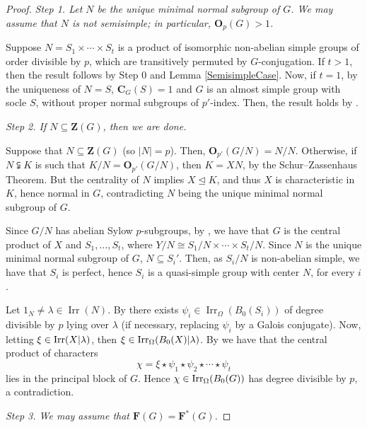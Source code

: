 \documentclass[12pt]{amsart}
\theoremstyle{theorem}
\theoremstyle{definition}
\newcommand{\bC} {\mathbf C}
\newcommand{\bF} {\mathbf F}
\newcommand{\bO}{{\mathbf O}}
\newcommand{\bZ} {\mathbf Z}
\newcommand{\Irr}{{\operatorname{Irr}}}
\begin{document}
\begin{proof}
		\bigskip
		
		\textit{Step 1. Let $N$ be the unique minimal normal subgroup of $G$. We may assume that $N$ is not semisimple; in particular, $\bO_p(G) > 1$.}
		\medskip
		
		Suppose $N = S_1 \times \cdots \times S_t$ is a product of isomorphic non-abelian simple groups of order divisible by $p$, which are transitively permuted by $G$-conjugation. If $t > 1$, then the result follows by Step 0 and Lemma \ref{SemisimpleCase}. Now, if $t = 1$, by the uniqueness of $N = S$, $\bC_G(S) = 1$ and $G$ is an almost simple group with socle $S$, without proper normal subgroups of $p'$-index. Then, the result holds by \cite[Theorem 2.17]{MMRSF}.
		
		\bigskip
		
		\textit{Step 2. If $N\subseteq\bZ(G)$, then we are done.}
		
		\medskip
		
		
		Suppose that $N\subseteq \bZ(G)$ (so $|N|=p$). Then, $\bO_{p'}(G/N) = N/N$. Otherwise, if $N \subsetneqq K$ is such that $K/N = \bO_{p'}(G/N)$, then $K = XN$, by the Schur--Zassenhaus Theorem. But the centrality of $N$ implies $X \unlhd K$, and thus $X$ is characteristic in $K$, hence normal in $G$, contradicting $N$ being the unique minimal normal subgroup of $G$. 
		
		Since $G/N$ has abelian Sylow $p$-subgroups, by \cite[Theorem 4.1]{MinimalHeights}, we have that $G$ is the central product of $X$ and $S_1,\ldots, S_t$, where $Y/N\cong S_1/N\times\cdots\times S_t/N$. Since $N$ is the unique minimal normal subgroup of $G$, $N\subseteq S_i'$. Then, as $S_i/N$ is non-abelian simple, we have that $S_i$ is perfect, hence $S_i$ is a quasi-simple group with center $N$, for every $i$. 
		
		Let $1_N\neq\lambda\in\Irr(N)$. By \cite[Theorem 2.9]{MMRSF} there exists $\psi_i \in \Irr_\Omega(B_0(S_i))$ of degree divisible by $p$ lying over $\lambda$ (if necessary, replacing $\psi_i$ by a Galois conjugate). Now, letting $\xi\in{\rm Irr}(X|\lambda)$, then $\xi\in{\rm Irr}_\Omega(B_0(X)|\lambda)$. By \cite[Lemma 4.1]{MN} we have that the central product of characters 
		$$\chi=\xi\star  \psi_1\star\psi_2\star \cdots\star \psi_t$$ lies in the principal block of $G$. Hence $\chi\in{\rm Irr}_\Omega(B_0(G))$ has degree divisible by $p$, a contradiction.
		\bigskip
		
		
		\textit{Step 3. We may assume that $\bF(G)=\bF^*(G)$.}
		\medskip
		

\end{proof}
\end{document}
